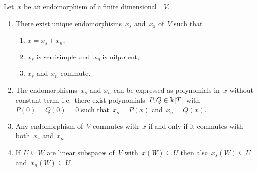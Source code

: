 \begin{theorem}
\label{concrete jordan decomposition}
  Let~$x$ be an endomorphism of a finite dimensional~{\vectorspace{$\kf$}}~$V$.
  \begin{enumerate}
    \item
      \label{existence and uniqueness of concrete jcd}
      There exist unique endomorphisms~$x_s$ and~$x_n$ of~$V$ such that
      \begin{enumerate}
        \item
          $x = x_s + x_n$,
        \item
          $x_s$ is semisimple and~$x_n$ is nilpotent,
        \item
          $x_s$ and~$x_n$ commute.
      \end{enumerate}
    \item
      \label{concrete jcd are polynomial}
      The endomorphisms~$x_s$ and~$x_n$ can be expressed as polynomials in~$x$ without constant term, i.e.\ there exist polynomials~$P,Q \in \mathbf{k}[T]$ with~$P(0) = Q(0) = 0$ such that~$x_s = P(x)$ and~$x_n = Q(x)$.
    \item
      \label{commuting via concrete jcd}
      Any endomorphism of~$V$ commutes with~$x$ if and only if it commutes with both~$x_s$ and~$x_n$.
    \item
      \label{concrete jcd compatible with mapping of subspaces}
      If~$U \subseteq W$ are linear subspaces of~$V$ with~$x(W) \subseteq U$ then also~$x_s(W) \subseteq U$ and~$x_n(W) \subseteq U$.
  \end{enumerate}
\end{theorem}


